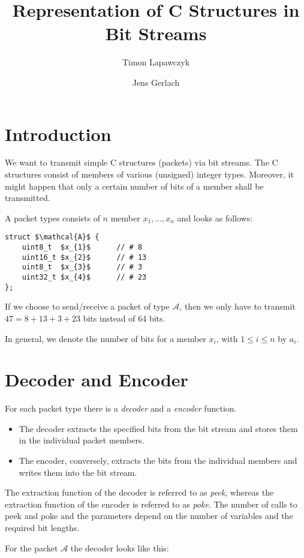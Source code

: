 \documentclass[parskip=half,paper=a4,DIV=13]{scrartcl}
\title{Representation of C Structures in Bit Streams}
\author{Timon Lapawczyk \and Jens Gerlach}
\begin{document}
\maketitle

\section{Introduction}

We want to transmit simple C structures (packets) via bit streams.
The C structures consist of members of various (unsigned) integer types.
Moreover, it might happen that only a certain number of bits of a member
shall be transmitted. 

A packet types consists of $n$ member $x_1,\ldots, x_n$ and looks as follows:

\begin{lstlisting}[mathescape]
struct $\mathcal{A}$ {
	uint8_t  $x_{1}$      // # 8
	uint16_t $x_{2}$      // # 13
	uint8_t  $x_{3}$      // # 3
	uint32_t $x_{4}$      // # 23
};
\end{lstlisting}

If we choose to send\slash receive a packet of type $\mathcal{A}$, then
we only have to transmit $47 = 8 + 13 + 3 + 23$ bits instead of 64 bits.

In general, we denote the number of bits for a member $x_i$, with $1 \leq i \leq n$  by $a_i$.

\section{Decoder and Encoder}

For each packet type there is a \emph{decoder} and a \emph{encoder} function.
\begin{itemize}
\item
The decoder extracts the specified bits from the bit stream and stores them
in the individual packet members.
\item
The encoder, conversely, extracts the bits from the individual members
and writes them into the bit stream.
\end{itemize}

The extraction function of the decoder is referred to as \emph{peek},
whereas the extraction function of the encoder is referred to as \emph{poke}.
The number of calls to peek and poke and the parameters depend on the number
of variables and the required bit lengths.

\pagebreak
For the packet $\mathcal{A}$ the decoder looks like this:
\end{document}
